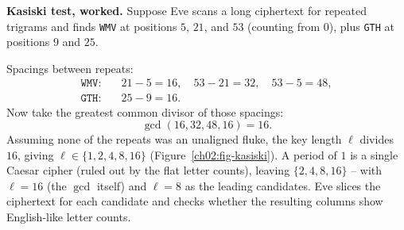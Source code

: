 \begin{attackbox}
\textbf{Kasiski test, worked.} Suppose Eve scans a long ciphertext for repeated trigrams and
finds \texttt{WMV} at positions $5$, $21$, and $53$ (counting from $0$), plus \texttt{GTH} at
positions $9$ and $25$.

Spacings between repeats:
\[
\begin{aligned}
\texttt{WMV}: &\quad 21-5 = 16, \quad 53-21 = 32, \quad 53-5 = 48,\\
\texttt{GTH}: &\quad 25-9 = 16.
\end{aligned}
\]
Now take the greatest common divisor of those spacings:
\[
  \gcd(16, 32, 48, 16) = 16.
\]
Assuming none of the repeats was an unaligned fluke, the key length $\ell$ divides $16$, giving
$\ell \in \{1,2,4,8,16\}$ (Figure~\ref{ch02:fig-kasiski}). A period of $1$ is a single Caesar
cipher (ruled out by the flat letter counts), leaving $\{2, 4, 8, 16\}$ -- with $\ell = 16$ (the
$\gcd$ itself) and $\ell = 8$ as the leading candidates. Eve slices the ciphertext for each
candidate and checks whether the resulting columns show English-like letter counts.
\end{attackbox}

